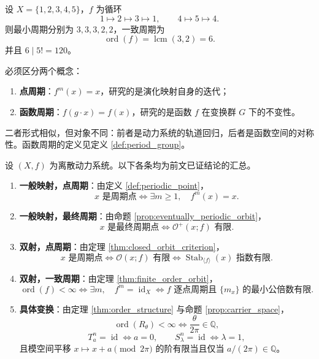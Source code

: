 \begin{example}[有限集上的双射]\label{ex:finite_bijection_period}
设 \(X=\{1,2,3,4,5\}\)，\(f\) 为循环
\[
1\mapsto 2\mapsto 3\mapsto 1,\qquad
4\mapsto 5\mapsto 4.
\]
则最小周期分别为 \(3,3,3,2,2\)，一致周期为
\[
\operatorname{ord}(f)=\operatorname{lcm}(3,2)=6.
\]
并且 \(6\mid 5!=120\)。
\end{example}

\begin{remark}[函数周期不等于点周期]\label{rem:function_period_vs_point_period}
必须区分两个概念：
\begin{enumerate}[label=(\roman*)]
    \item \textbf{点周期}：\(f^m(x)=x\)，研究的是演化映射自身的迭代；
    \item \textbf{函数周期}：\(f(g\cdot x)=f(x)\)，研究的是函数 \(f\) 在变换群 \(G\) 下的不变性。
\end{enumerate}
二者形式相似，但对象不同：前者是动力系统的轨道回归，后者是函数空间的对称性。函数周期的定义见定义 \ref{def:period_group}。
\end{remark}

\begin{theorem}[周期类型总判据]\label{thm:period_type_master_criterion}
设 \((X,f)\) 为离散动力系统。以下各条均为前文已证结论的汇总。
\begin{enumerate}[label=(\Alph*)]
    \item \textbf{一般映射，点周期}：由定义 \ref{def:periodic_point}，
    \[
    x\text{ 是周期点}
    \iff
    \exists m\ge 1,\quad f^m(x)=x.
    \]
    \item \textbf{一般映射，最终周期}：由命题 \ref{prop:eventually_periodic_orbit}，
    \[
    x\text{ 是最终周期点}
    \iff
    \mathcal O^+(x;f)\text{ 有限}.
    \]
    \item \textbf{双射，点周期}：由定理 \ref{thm:closed_orbit_criterion}，
    \[
    x\text{ 是周期点}
    \iff
    \mathcal O(x;f)\text{ 有限}
    \iff
    \operatorname{Stab}_{\langle f\rangle}(x)\text{ 指数有限}.
    \]
    \item \textbf{双射，一致周期}：由定理 \ref{thm:finite_order_orbit}，
    \[
    \operatorname{ord}(f)<\infty
    \iff
    \exists m,\quad f^m=\operatorname{id}_X
    \iff
    f\text{ 逐点周期且 }\{m_x\}\text{ 的最小公倍数有限}.
    \]
    \item \textbf{具体变换}：由定理 \ref{thm:order_structure} 与命题 \ref{prop:carrier_space}，
    \[
    \operatorname{ord}(R_\theta)<\infty
    \iff
    \frac{\theta}{2\pi}\in\mathbb Q,
    \]
    \[
    T_a^n=\operatorname{id}\iff a=0,
    \qquad
    S_\lambda^n=\operatorname{id}\iff \lambda=1,
    \]
    且模空间平移 \(x\mapsto x+a\pmod{2\pi}\) 的阶有限当且仅当 \(a/(2\pi)\in\mathbb Q\)。
\end{enumerate}
\end{theorem}

